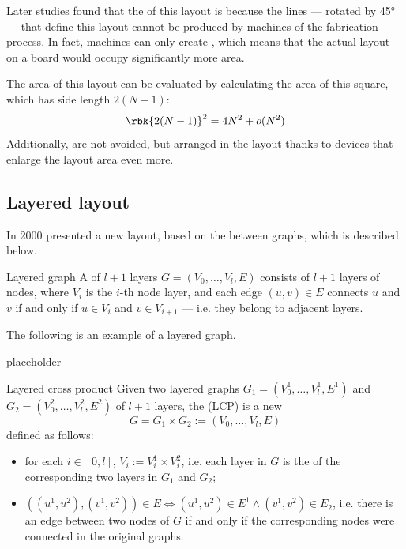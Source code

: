 \documentclass[a4paper, 12pt]{report}
\begin{document}
    Later studies found that the  of this layout is  because the  lines --- rotated by 45° --- that define this layout cannot be produced by machines of the fabrication process. In fact, machines can only create , which means that the actual layout on a board would occupy significantly more area.


    The area of this layout can be evaluated by calculating the area of this  square, which has side length $2(N - 1)$: $$\rbk{2(N -1)}^2 = 4N^2 + o(N^2)$$ Additionally,  are not avoided, but arranged in the layout thanks to devices that enlarge the layout area even more.

    \subsection{Layered layout}

    In 2000 \textcite{seven} presented a new layout, based on the  between graphs, which is described below.

    \begin{frameddefn}{Layered graph}
        A  of $l + 1$ layers $G = (V_0, \ldots, V_l, E)$ consists of $l + 1$ layers of nodes, where $V_i$ is the $i$-th node layer, and each edge $(u, v) \in E$ connects $u$ and $v$ if and only if $u \in V_i$ and $v \in V_{i + 1}$ --- i.e. they belong to adjacent layers.
    \end{frameddefn}

    \begin{example}
        The following is an example of a layered graph.

        placeholder 
    \end{example}

    \begin{frameddefn}{Layered cross product}
        Given two layered graphs $G_1 = (V_0^1, \ldots, V_l^1, E^1)$ and $G_2 = (V_0^2, \ldots, V_l^2, E^2)$ of $l + 1$ layers, the  (LCP) is a new  $$G = G_1 \times G_2 := (V_0, \ldots, V_l, E)$$ defined as follows:

        \begin{itemize}
            \item for each $i \in [0, l]$, $V_i := V_i ^1 \times V_i^2$, i.e. each layer in $G$ is the  of the corresponding two layers in $G_1$ and $G_2$;
            \item $((u^1, u^2), (v^1, v^2)) \in E \iff (u^1, u^2) \in E^1 \land (v^1, v^2) \in E_2$, i.e. there is an edge between two nodes of $G$ if and only if the corresponding nodes were connected in the original graphs.
        \end{itemize}
    \end{frameddefn}
\end{document}

